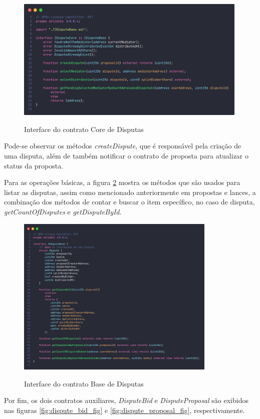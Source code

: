 \begin{figure}[!h]
  \centering
  \caption{Interface do contrato Core de Disputas}
  \includegraphics[width=420px]{src/images/contracts/dispute_core.png}
  \label{fig:dispute_core_fig}
\end{figure}

Pode-se observar os métodos \textit{createDispute}, que é responsável pela criação de uma disputa, além de também notificar o contrato de proposta para atualizar o status da proposta.

Para as operações básicas, a figura \ref{fig:dispute_base_fig} mostra os métodos que são usados para listar as disputas, assim como mencionado anteriormente em propostas e lances, a combinação dos métodos de contar e buscar o item específico, no caso de disputa, \textit{getCountOfDisputes} e \textit{getDisputeById}.

\begin{figure}[!h]
  \centering
  \caption{Interface do contrato Base de Disputas}
  \includegraphics[width=360px]{src/images/contracts/dispute_base.png}
  \label{fig:dispute_base_fig}
\end{figure}

Por fim, os dois contratos auxiliares, \textit{DisputeBid} e \textit{DisputeProposal} são exibidos nas figuras \ref{fig:dispute_bid_fig} e \ref{fig:dispute_proposal_fig}, respectivamente.

